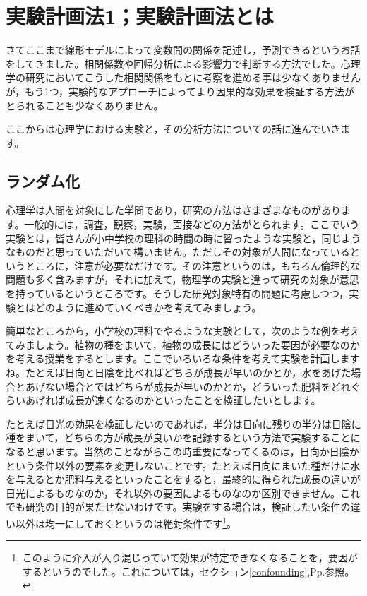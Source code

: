 \documentclass{ltjbook}
\begin{document}
\chapter{実験計画法1；実験計画法とは}
\label{m12_design1}

さてここまで線形モデルによって変数間の関係を記述し，予測できるというお話をしてきました。相関係数や回帰分析による影響力で判断する方法でした。心理学の研究においてこうした相関関係をもとに考察を進める事は少なくありませんが，もう1つ，実験的なアプローチによってより因果的な効果を検証する方法がとられることも少なくありません。

ここからは心理学における実験と，その分析方法についての話に進んでいきます。


\section{ランダム化}
\label{RCT}
心理学は人間を対象にした学問であり，研究の方法はさまざまなものがあります。一般的には，調査，観察，実験，面接などの方法がとられます。ここでいう実験とは，皆さんが小中学校の理科の時間の時に習ったような実験と，同じようなものだと思っていただいて構いません。ただしその対象が人間になっているというところに，注意が必要なだけです。その注意というのは，もちろん倫理的な問題も多く含みますが，それに加えて，物理学の実験と違って研究の対象が意思を持っているというところです。そうした研究対象特有の問題に考慮しつつ，実験とはどのように進めていくべきかを考えてみましょう。

簡単なところから，小学校の理科でやるような実験として，次のような例を考えてみましょう。植物の種をまいて，植物の成長にはどういった要因が必要なのかを考える授業をするとします。ここでいろいろな条件を考えて実験を計画しますね。たとえば日向と日陰を比べればどちらが成長が早いのかとか，水をあげた場合とあげない場合とではどちらが成長が早いのかとか，どういった肥料をどれぐらいあげれば成長が速くなるのかといったことを検証したいとします。

たとえば日光の効果を検証したいのであれば，半分は日向に残りの半分は日陰に種をまいて，どちらの方が成長が良いかを記録するという方法で実験することになると思います。当然のことながらこの時重要になってくるのは，日向か日陰かという条件以外の要素を変更しないことです。たとえば日向にまいた種だけに水を与えるとか肥料与えるといったことをすると，最終的に得られた成長の違いが日光によるものなのか，それ以外の要因によるものなのか区別できません。これでも研究の目的が果たせないわけです。実験をする場合は，検証したい条件の違い以外は均一にしておくというのは絶対条件です\footnote{このように介入が入り混じっていて効果が特定できなくなることを，要因がするというのでした。これについては，セクション\ref{confounding},Pp.\pageref{confounding}参照。}。
\end{document}
